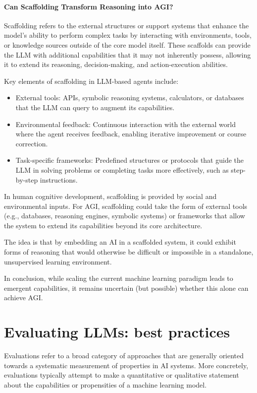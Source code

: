 \paragraph{Can Scaffolding Transform Reasoning into AGI?}
Scaffolding refers to the external structures or support systems that enhance the model's ability to perform complex tasks by interacting with environments, tools, or knowledge sources outside of the core model itself. These scaffolds can provide the LLM with additional capabilities that it may not inherently possess, allowing it to extend its reasoning, decision-making, and action-execution abilities.

Key elements of scaffolding in LLM-based agents include:
\begin{itemize}
\item External tools: APIs, symbolic reasoning systems, calculators, or databases that the LLM can query to augment its capabilities.
\item Environmental feedback: Continuous interaction with the external world where the agent receives feedback, enabling iterative improvement or course correction.
\item Task-specific frameworks: Predefined structures or protocols that guide the LLM in solving problems or completing tasks more effectively, such as step-by-step instructions.
\end{itemize}

In human cognitive development, scaffolding is provided by social and environmental inputs. For AGI, scaffolding could take the form of external tools (e.g., databases, reasoning engines, symbolic systems) or frameworks that allow the system to extend its capabilities beyond its core architecture.

The idea is that by embedding an AI in a scaffolded system, it could exhibit forms of reasoning that would otherwise be difficult or impossible in a standalone, unsupervised learning environment. 

In conclusion, while scaling the current machine learning paradigm leads to emergent capabilities, it remains uncertain (but possible) whether this alone can achieve AGI.


\section{Evaluating LLMs: best practices}
\label{sec:evaluatingllm}
Evaluations refer to a broad category of approaches that are generally oriented towards a systematic measurement of properties in AI systems.
More concretely, evaluations typically attempt to make a quantitative or qualitative statement about the capabilities or propensities of a machine learning model. 


